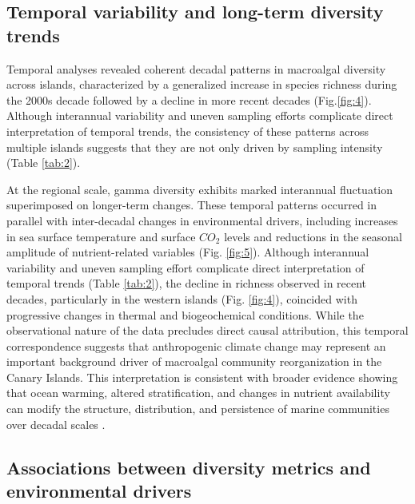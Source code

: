 \documentclass[a4paper,fleqn]{cas-sc}
\begin{document}
\subsection{Temporal variability and long-term diversity trends}

Temporal analyses revealed coherent decadal patterns in macroalgal diversity across islands, characterized by a generalized increase in species richness during the 2000s decade followed by a decline in more recent decades (Fig.\ref{fig:4}). Although interannual variability and uneven sampling efforts complicate direct interpretation of temporal trends, the consistency of these patterns across multiple islands suggests that they are not only driven by sampling intensity (Table \ref{tab:2}).

At the regional scale, gamma diversity exhibits marked interannual fluctuation superimposed on longer-term changes. These temporal patterns occurred in parallel with inter-decadal changes in environmental drivers, including increases in sea surface temperature and surface $CO_{2}$ levels and reductions in the seasonal amplitude of nutrient-related variables (Fig. \ref{fig:5}). Although interannual variability and uneven sampling effort complicate direct interpretation of temporal trends (Table \ref{tab:2}), the decline in richness observed in recent decades, particularly in the western islands (Fig.  \ref{fig:4}), coincided with progressive changes in thermal and biogeochemical conditions. While the observational nature of the data precludes direct causal attribution, this temporal correspondence suggests that anthropogenic climate change may represent an important background driver of macroalgal community reorganization in the Canary Islands. This interpretation is consistent with broader evidence showing that ocean warming, altered stratification, and changes in nutrient availability can modify the structure, distribution, and persistence of marine communities over decadal scales \citep{Doneyetal2012, Antao2020, JI202191, Noissetteetal2022}.

\subsection{Associations between diversity metrics and environmental drivers}
\end{document}
